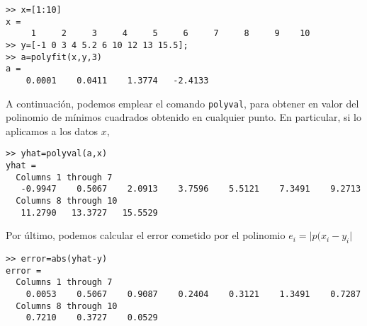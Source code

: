 \begin{verbatim}>> x=[1:10]
x =
     1     2     3     4     5     6     7     8     9    10
>> y=[-1 0 3 4 5.2 6 10 12 13 15.5];
>> a=polyfit(x,y,3)
a =
    0.0001    0.0411    1.3774   -2.4133
\end{verbatim}
\begin{paracol}{2}
A continuación, podemos emplear el comando \texttt{polyval}, para obtener en valor del polinomio de mínimos cuadrados obtenido en cualquier punto. En particular, si lo aplicamos a los datos $x$,
\end{paracol}
\begin{verbatim}
>> yhat=polyval(a,x)
yhat =
  Columns 1 through 7
   -0.9947    0.5067    2.0913    3.7596    5.5121    7.3491    9.2713
  Columns 8 through 10
   11.2790   13.3727   15.5529
\end{verbatim}
\begin{paracol}{2}
Por último, podemos calcular el error cometido por el polinomio $e_i=\vert p(x_i-y_i \vert$
\end{paracol}
\begin{verbatim}
>> error=abs(yhat-y)
error =
  Columns 1 through 7
    0.0053    0.5067    0.9087    0.2404    0.3121    1.3491    0.7287
  Columns 8 through 10
    0.7210    0.3727    0.0529
\end{verbatim}

